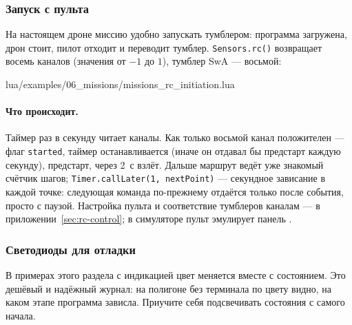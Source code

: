 \subsubsection*{Запуск с пульта}

На настоящем дроне миссию удобно запускать тумблером: программа загружена, дрон стоит, пилот отходит и переводит тумблер. \verb|Sensors.rc()| возвращает восемь каналов (значения от $-1$ до $1$), тумблер SwA --- восьмой:

\begin{codefile}{lua/examples/06_missions/missions_rc_initiation.lua}
\end{codefile}

\paragraph{Что происходит.} Таймер раз в секунду читает каналы. Как только восьмой канал положителен --- флаг \verb|started|, таймер останавливается (иначе он отдавал бы предстарт каждую секунду), предстарт, через 2~с взлёт. Дальше маршрут ведёт уже знакомый счётчик шагов; \verb|Timer.callLater(1, nextPoint)| --- секундное зависание в каждой точке: следующая команда по-прежнему отдаётся только после события, просто с паузой. Настройка пульта и соответствие тумблеров каналам --- в приложении~\ref{sec:rc-control}; в симуляторе пульт эмулирует панель .

\subsubsection*{Светодиоды для отладки}

В примерах этого раздела с индикацией цвет меняется вместе с состоянием. Это дешёвый и надёжный журнал: на полигоне без терминала по цвету видно, на каком этапе программа зависла. Приучите себя подсвечивать состояния с самого начала.
